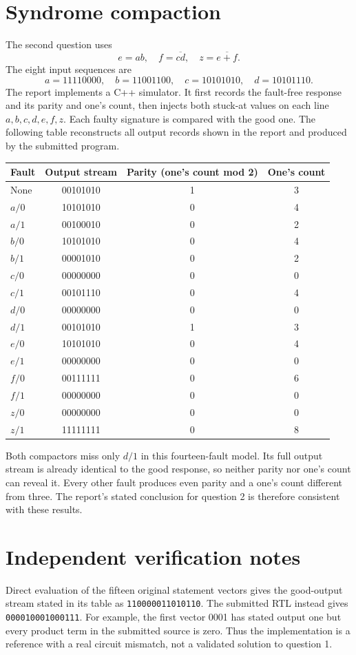 \documentclass[11pt,a4paper]{article}
\begin{document}
\section{Syndrome compaction}
The second question uses
\[e=ab,\quad f=\overline{cd},\quad z=\overline{e+f}.\]
The eight input sequences are
\[a=11110000,\quad b=11001100,\quad c=10101010,\quad d=10101110.\]
The report implements a C++ simulator. It first records the fault-free response and its parity and one's count, then injects both stuck-at values on each line $a,b,c,d,e,f,z$. Each faulty signature is compared with the good one. The following table reconstructs all output records shown in the report and produced by the submitted program.
\begin{center}
\begin{tabular}{lccc}\toprule
Fault&Output stream&Parity (one's count mod 2)&One's count\\\midrule
None&00101010&1&3\\
$a/0$&10101010&0&4\\
$a/1$&00100010&0&2\\
$b/0$&10101010&0&4\\
$b/1$&00001010&0&2\\
$c/0$&00000000&0&0\\
$c/1$&00101110&0&4\\
$d/0$&00000000&0&0\\
$d/1$&00101010&1&3\\
$e/0$&10101010&0&4\\
$e/1$&00000000&0&0\\
$f/0$&00111111&0&6\\
$f/1$&00000000&0&0\\
$z/0$&00000000&0&0\\
$z/1$&11111111&0&8\\\bottomrule
\end{tabular}\end{center}
Both compactors miss only $d/1$ in this fourteen-fault model. Its full output stream is already identical to the good response, so neither parity nor one's count can reveal it. Every other fault produces even parity and a one's count different from three. The report's stated conclusion for question 2 is therefore consistent with these results.

\section{Independent verification notes}
Direct evaluation of the fifteen original statement vectors gives the good-output stream stated in its table as \texttt{110000011010110}. The submitted RTL instead gives \texttt{000010001000111}. For example, the first vector 0001 has stated output one but every product term in the submitted source is zero. Thus the implementation is a reference with a real circuit mismatch, not a validated solution to question 1.
\end{document}
